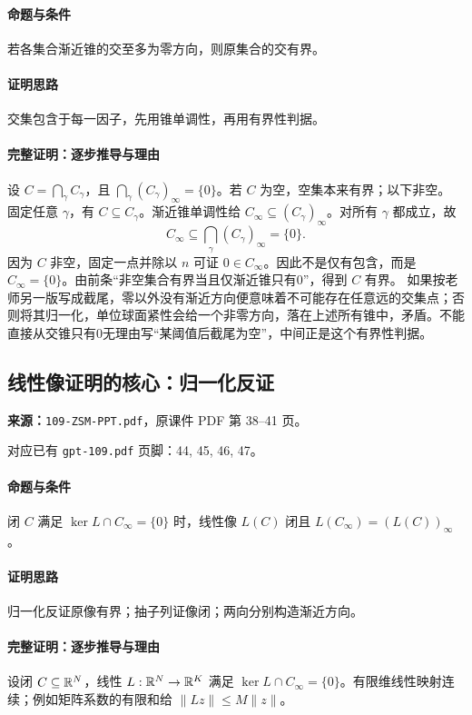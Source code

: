 \paragraph{命题与条件}若各集合渐近锥的交至多为零方向，则原集合的交有界。
\paragraph{证明思路}交集包含于每一因子，先用锥单调性，再用有界性判据。
\paragraph{完整证明：逐步推导与理由}

设 $C=\bigcap_\gamma C_\gamma$，且 $\bigcap_\gamma(C_\gamma)_\infty=\{0\}$。若 $C$ 为空，空集本来有界；以下非空。
固定任意 $\gamma$，有 $C\subseteq C_\gamma$。渐近锥单调性给 $C_\infty\subseteq(C_\gamma)_\infty$。对所有 $\gamma$ 都成立，故
\[C_\infty\subseteq\bigcap_\gamma(C_\gamma)_\infty=\{0\}.\]
因为 $C$ 非空，固定一点并除以 $n$ 可证 $0\in C_\infty$。因此不是仅有包含，而是 $C_\infty=\{0\}$。由前条“非空集合有界当且仅渐近锥只有0”，得到 $C$ 有界。
如果按老师另一版写成截尾，零以外没有渐近方向便意味着不可能存在任意远的交集点；否则将其归一化，单位球面紧性会给一个非零方向，落在上述所有锥中，矛盾。不能直接从交锥只有0无理由写“某阈值后截尾为空”，中间正是这个有界性判据。

\clearpage\subsection{线性像证明的核心：归一化反证}
\textbf{来源：}\texttt{109-ZSM-PPT.pdf}，原课件 PDF 第 38--41 页。\par
对应已有 \texttt{gpt-109.pdf} 页脚：44, 45, 46, 47。\par
\paragraph{命题与条件}闭 $C$ 满足 $\ker L\cap C_\infty=\{0\}$ 时，线性像 $L(C)$ 闭且 $L(C_\infty)=(L(C))_\infty$。
\paragraph{证明思路}归一化反证原像有界；抽子列证像闭；两向分别构造渐近方向。
\paragraph{完整证明：逐步推导与理由}

设闭 $C\subseteq\mathbb{R}^N$，线性 $L:\mathbb{R}^N\to\mathbb{R}^K$ 满足 $\ker L\cap C_\infty=\{0\}$。有限维线性映射连续；例如矩阵系数的有限和给 $\|Lz\|\le M\|z\|$。
